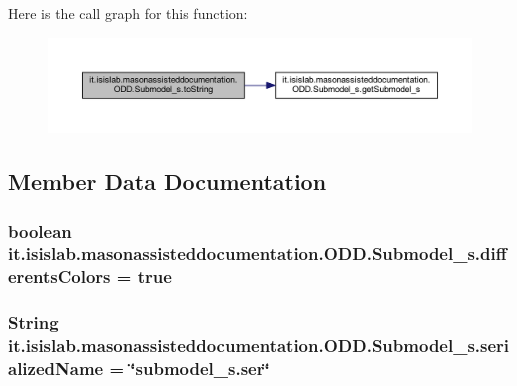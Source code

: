 Here is the call graph for this function\-:\nopagebreak
\begin{figure}[H]
\begin{center}
\leavevmode
\includegraphics[width=350pt]{classit_1_1isislab_1_1masonassisteddocumentation_1_1_o_d_d_1_1_submodel__s_aaef6a78efd50526e52b6fb83b4222f11_cgraph}
\end{center}
\end{figure}




\subsection{Member Data Documentation}
\hypertarget{classit_1_1isislab_1_1masonassisteddocumentation_1_1_o_d_d_1_1_submodel__s_adfe49ada88df75cac690d3cdd91b4c9d}{
\subsubsection[{differents\-Colors}]{\setlength{\rightskip}{0pt plus 5cm}boolean it.\-isislab.\-masonassisteddocumentation.\-O\-D\-D.\-Submodel\-\_\-s.\-differents\-Colors = true\hspace{0.3cm}{\ttfamily [static]}}}\label{classit_1_1isislab_1_1masonassisteddocumentation_1_1_o_d_d_1_1_submodel__s_adfe49ada88df75cac690d3cdd91b4c9d}
\hypertarget{classit_1_1isislab_1_1masonassisteddocumentation_1_1_o_d_d_1_1_submodel__s_a7b9cf4ddeacb2ad2206a2e309ebd297b}{
\subsubsection[{serialized\-Name}]{\setlength{\rightskip}{0pt plus 5cm}String it.\-isislab.\-masonassisteddocumentation.\-O\-D\-D.\-Submodel\-\_\-s.\-serialized\-Name = \char`\"{}submodel\-\_\-s.\-ser\char`\"{}\hspace{0.3cm}{\ttfamily [static]}}}\label{classit_1_1isislab_1_1masonassisteddocumentation_1_1_o_d_d_1_1_submodel__s_a7b9cf4ddeacb2ad2206a2e309ebd297b}
